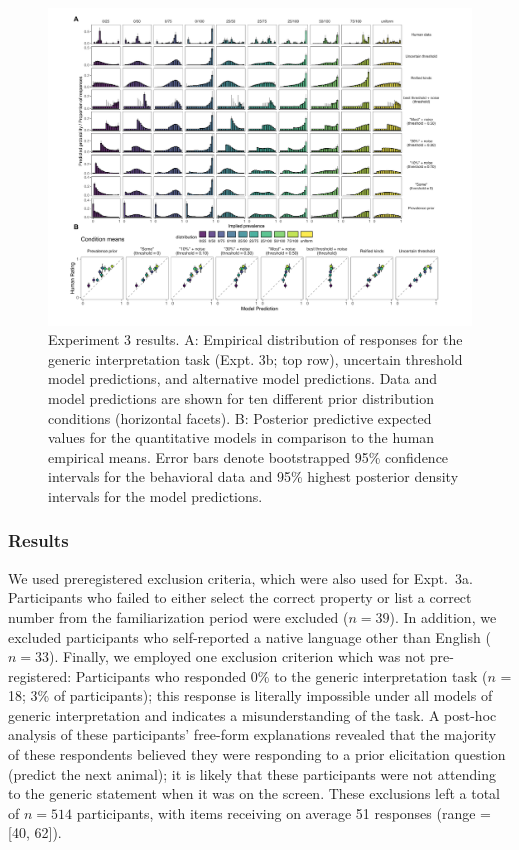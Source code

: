 \documentclass[floatsintext,man]{apa6}
\begin{document}
\begin{figure}
\centering
\includegraphics{figs/expt2_model-results_nozero2.pdf}
\caption{\label{fig:genint-modelingResults2}Experiment 3 results. A: Empirical distribution of responses for the generic interpretation task (Expt. 3b; top row), uncertain threshold model predictions, and alternative model predictions. Data and model predictions are shown for ten different prior distribution conditions (horizontal facets). B: Posterior predictive expected values for the quantitative models in comparison to the human empirical means. Error bars denote bootstrapped 95\% confidence intervals for the behavioral data and 95\% highest posterior density intervals for the model predictions.}
\end{figure}



\hypertarget{results-2}{%
\subsubsection{Results}\label{results-2}}

We used preregistered exclusion criteria, which were also used for Expt.~3a.
Participants who failed to either select the correct property or list a correct number from the familiarization period were excluded (\(n = 39\)).
In addition, we excluded participants who self-reported a native language other than English (\(n = 33\)).
Finally, we employed one exclusion criterion which was not pre-registered: Participants who responded 0\% to the generic interpretation task ($n$ = 18; 3\% of participants); this response is literally impossible under all models of generic interpretation and indicates a misunderstanding of the task. 
A post-hoc analysis of these participants' free-form explanations revealed that the majority of these respondents believed they were responding to a prior elicitation question (predict the next animal); it is likely that these participants were not attending to the generic statement when it was on the screen.
These exclusions left a total of \(n = 514\) participants, with items receiving on average 51 responses (range = {[}40, 62{]}).
\end{document}
